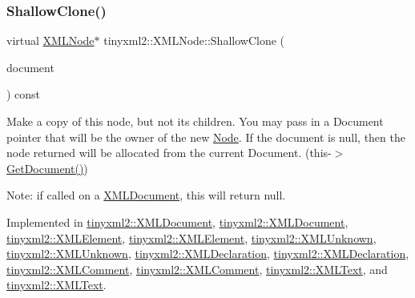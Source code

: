 \subsubsection{\texorpdfstring{Shallow\+Clone()}{ShallowClone()}\hspace{0.1cm}{\footnotesize\ttfamily [1/2]}}
{\footnotesize\ttfamily virtual \hyperlink{classtinyxml2_1_1XMLNode}{X\+M\+L\+Node}$\ast$ tinyxml2\+::\+X\+M\+L\+Node\+::\+Shallow\+Clone (\begin{DoxyParamCaption}\item[{\hyperlink{classtinyxml2_1_1XMLDocument}{X\+M\+L\+Document} $\ast$}]{document }\end{DoxyParamCaption}) const\hspace{0.3cm}{\ttfamily [pure virtual]}}

Make a copy of this node, but not its children. You may pass in a Document pointer that will be the owner of the new \hyperlink{classNode}{Node}. If the \textquotesingle{}document\textquotesingle{} is null, then the node returned will be allocated from the current Document. (this-\/$>$\hyperlink{classtinyxml2_1_1XMLNode_af343d1ef0b45c0020e62d784d7e67a68}{Get\+Document()})

Note\+: if called on a \hyperlink{classtinyxml2_1_1XMLDocument}{X\+M\+L\+Document}, this will return null. 

Implemented in \hyperlink{classtinyxml2_1_1XMLDocument_aa37cc1709d7e1e988bc17dcfb24a69b8}{tinyxml2\+::\+X\+M\+L\+Document}, \hyperlink{classtinyxml2_1_1XMLDocument_aa37cc1709d7e1e988bc17dcfb24a69b8}{tinyxml2\+::\+X\+M\+L\+Document}, \hyperlink{classtinyxml2_1_1XMLElement_ac035742d68b0c50c3f676374e59fe750}{tinyxml2\+::\+X\+M\+L\+Element}, \hyperlink{classtinyxml2_1_1XMLElement_aafa2807a45b28fe096b29d76e6a13b7c}{tinyxml2\+::\+X\+M\+L\+Element}, \hyperlink{classtinyxml2_1_1XMLUnknown_a0125f41c89763dea06619b5fd5246b4c}{tinyxml2\+::\+X\+M\+L\+Unknown}, \hyperlink{classtinyxml2_1_1XMLUnknown_ab73b48b819aa4b2ef3815dc2d7d20d5f}{tinyxml2\+::\+X\+M\+L\+Unknown}, \hyperlink{classtinyxml2_1_1XMLDeclaration_a118d47518dd9e522644e42efa259aed7}{tinyxml2\+::\+X\+M\+L\+Declaration}, \hyperlink{classtinyxml2_1_1XMLDeclaration_ad9d60e6d2df75c13eb6bf7319985b747}{tinyxml2\+::\+X\+M\+L\+Declaration}, \hyperlink{classtinyxml2_1_1XMLComment_a08991cc63fadf7e95078ac4f9ea1b073}{tinyxml2\+::\+X\+M\+L\+Comment}, \hyperlink{classtinyxml2_1_1XMLComment_adf5b5c0319351dcc339df098d11e8fb2}{tinyxml2\+::\+X\+M\+L\+Comment}, \hyperlink{classtinyxml2_1_1XMLText_af3a81ed4dd49d5151c477b3f265a3011}{tinyxml2\+::\+X\+M\+L\+Text}, and \hyperlink{classtinyxml2_1_1XMLText_a86d265c93152726c8c6831e9594840e6}{tinyxml2\+::\+X\+M\+L\+Text}.

